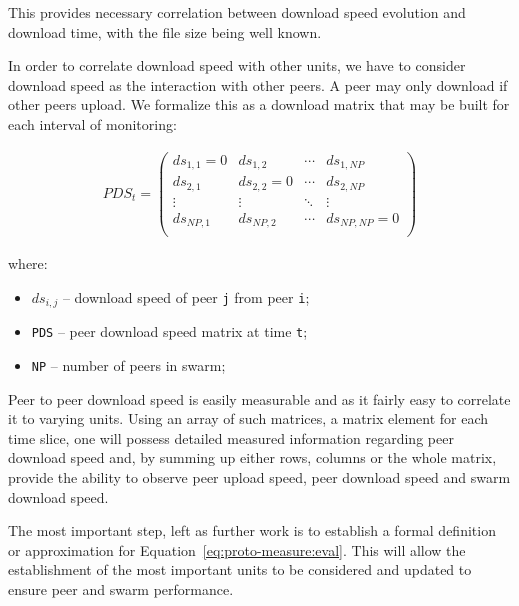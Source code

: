 This provides necessary correlation between download speed evolution and
download time, with the file size being well known.

In order to correlate download speed with other units, we have to consider
download speed as the interaction with other peers. A peer may only download
if other peers upload. We formalize this as a download matrix that may
be built for each interval of monitoring:

\begin{align}
  PDS_{t} =
  \begin{pmatrix}
    ds_{1,1} = 0 & ds_{1,2} & \cdots & ds_{1,NP} \\
    ds_{2,1} & ds_{2,2} = 0 & \cdots & ds_{2,NP} \\
    \vdots & \vdots & \ddots & \vdots \\
    ds_{NP,1} & ds_{NP,2} & \cdots & ds_{NP,NP} = 0 \\
  \end{pmatrix}
\end{align}

where:

\begin{itemize}
  \item $ds_{i,j}$ -- download speed of peer \texttt{j} from peer \texttt{i};
  \item \texttt{PDS} -- peer download speed matrix at time \texttt{t};
  \item \texttt{NP} -- number of peers in swarm;
\end{itemize}

Peer to peer download speed is easily measurable and as it fairly easy to
correlate it to varying units. Using an array of such matrices, a matrix
element for each time slice, one will possess detailed measured information
regarding peer download speed and, by summing up either rows, columns or the
whole matrix, provide the ability to observe peer upload speed, peer download
speed and swarm download speed.

The most important step, left as further work is to establish a formal
definition or approximation for Equation~\ref{eq:proto-measure:eval}. This
will allow the establishment of the most important units to be considered and
updated to ensure peer and swarm performance.
